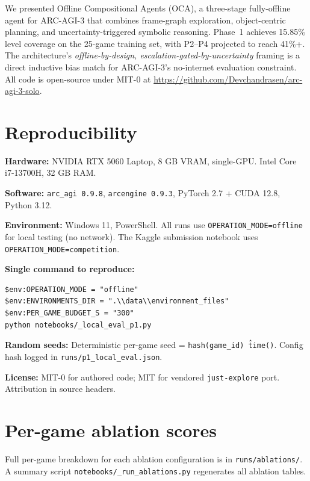 \documentclass[10pt,letterpaper]{article}
\begin{document}
We presented Offline Compositional Agents (OCA), a three-stage fully-offline agent for ARC-AGI-3 that combines frame-graph exploration, object-centric planning, and uncertainty-triggered symbolic reasoning.
Phase~1 achieves 15.85\% level coverage on the 25-game training set, with P2--P4 projected to reach 41\%+.
The architecture's \textit{offline-by-design, escalation-gated-by-uncertainty} framing is a direct inductive bias match for ARC-AGI-3's no-internet evaluation constraint.
All code is open-source under MIT-0 at \url{https://github.com/Devchandrasen/arc-agi-3-solo}.




\appendix
\section{Reproducibility}

\textbf{Hardware:} NVIDIA RTX 5060 Laptop, 8 GB VRAM, single-GPU.
Intel Core i7-13700H, 32 GB RAM.

\textbf{Software:} \texttt{arc\_agi 0.9.8}, \texttt{arcengine 0.9.3}, PyTorch 2.7 + CUDA 12.8, Python 3.12.

\textbf{Environment:} Windows 11, PowerShell.
All runs use \texttt{OPERATION\_MODE=offline} for local testing (no network).
The Kaggle submission notebook uses \texttt{OPERATION\_MODE=competition}.

\textbf{Single command to reproduce:}
\begin{verbatim}
$env:OPERATION_MODE = "offline"
$env:ENVIRONMENTS_DIR = ".\\data\\environment_files"
$env:PER_GAME_BUDGET_S = "300"
python notebooks/_local_eval_p1.py
\end{verbatim}

\textbf{Random seeds:} Deterministic per-game seed = \texttt{hash(game\_id) \^ time()}.
Config hash logged in \texttt{runs/p1\_local\_eval.json}.

\textbf{License:} MIT-0 for authored code; MIT for vendored \texttt{just-explore} port.
Attribution in source headers.

\section{Per-game ablation scores}

Full per-game breakdown for each ablation configuration is in \texttt{runs/ablations/}.
A summary script \texttt{notebooks/\_run\_ablations.py} regenerates all ablation tables.
\end{document}
